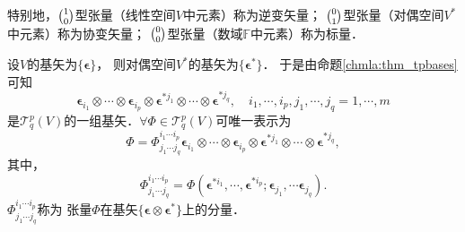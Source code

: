 特别地，$\binom{1}{0}$型张量（线性空间$V$中元素）称为{\heiti 逆变矢量}；
$\binom{0}{1}$型张量（对偶空间$V^*$中元素）称为{\heiti 协变矢量}；
$\binom{0}{0}$型张量（数域$\mathbb{F}$中元素）称为{\heiti 标量}．


设$V$的基矢为$\{\boldsymbol{\epsilon}\}$，
则对偶空间$V^*$的基矢为$\{\boldsymbol{\epsilon}^{*}\}$．
于是由命题\ref{chmla:thm_tpbases}可知
\begin{equation}
    \boldsymbol{\epsilon}_{i_1} \otimes\cdots\otimes \boldsymbol{\epsilon}_{i_p} \otimes
    \boldsymbol{\epsilon}^{*j_1} \otimes\cdots\otimes \boldsymbol{\epsilon}^{*j_q}, \quad
    i_1, \cdots, i_p, j_1, \cdots, j_q = 1,\cdots, m
\end{equation}
是$\mathcal{T}^p_q(V)$的一组基矢．$\forall \Phi \in \mathcal{T}^p_q(V)$可唯一表示为
\begin{equation}\label{chmla:eqn_tmp201}
    \Phi = \Phi^{i_1 \cdots i_p} _{j_1 \cdots j_q}
    \boldsymbol{\epsilon}_{i_1} \otimes\cdots\otimes \boldsymbol{\epsilon}_{i_p} \otimes
    \boldsymbol{\epsilon}^{*j_1} \otimes\cdots\otimes \boldsymbol{\epsilon}^{*j_q},
\end{equation}
其中，
\begin{equation}\label{chmla:eqn_tmp203}
    \Phi^{i_1 \cdots i_p} _{j_1 \cdots j_q} =
    \Phi(\boldsymbol{\epsilon}^{*i_1}, \cdots, \boldsymbol{\epsilon}^{*i_p};
    \boldsymbol{\epsilon}_{j_1},\cdots \boldsymbol{\epsilon}_{j_q}) .
\end{equation}
$\Phi^{i_1 \cdots i_p} _{j_1 \cdots j_q}$称为
张量$\Phi$在基矢$\{\boldsymbol{\epsilon}\otimes\boldsymbol{\epsilon}^{*}\}$上的{\heiti 分量}．

